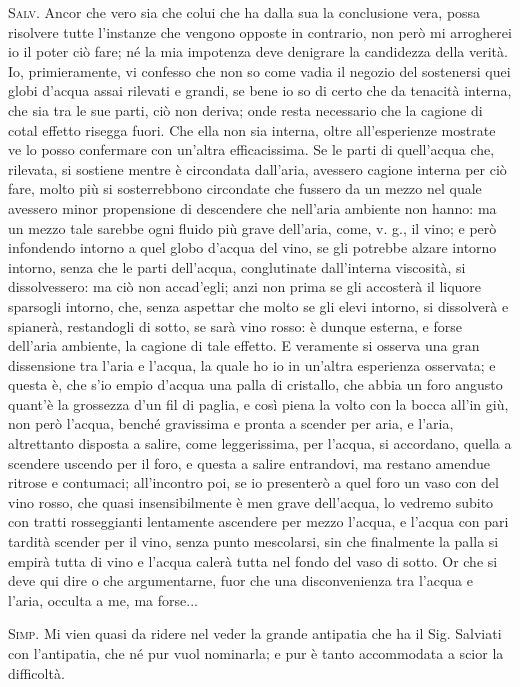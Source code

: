 \documentclass[11pt,twoside,openany]{book}
\newcommand{\speaker}[1]{\textcolor{rubric}{\textsc{#1}}\space}
\begin{document}
\speaker{Salv.} Ancor che vero sia che colui che ha dalla sua la conclusione vera, possa risolvere tutte l'instanze che vengono opposte in contrario, non però mi arrogherei io il poter ciò fare; né la mia impotenza deve denigrare la candidezza della verità. Io, primieramente, vi confesso che non so come vadia il negozio del sostenersi quei globi d'acqua assai rilevati e grandi, se bene io so di certo che da tenacità interna, che sia tra le sue parti, ciò non deriva; onde resta necessario che la cagione di cotal effetto risegga fuori. Che ella non sia interna, oltre all'esperienze mostrate ve lo posso confermare con un'altra efficacissima. Se le parti di quell'acqua che, rilevata, si sostiene mentre è circondata dall'aria, avessero cagione interna per ciò fare, molto più si sosterrebbono circondate che fussero da un mezzo nel quale avessero minor propensione di descendere che nell'aria ambiente non hanno: ma un mezzo tale sarebbe ogni fluido più grave dell'aria, come, v. g., il vino; e però infondendo intorno a quel globo d'acqua del vino, se gli potrebbe alzare intorno intorno, senza che le parti dell'acqua, conglutinate dall'interna viscosità, si dissolvessero: ma ciò non accad'egli; anzi non prima se gli accosterà il liquore sparsogli intorno, che, senza aspettar che molto se gli elevi intorno, si dissolverà e spianerà, restandogli di sotto, se sarà vino rosso: è dunque esterna, e forse dell'aria ambiente, la cagione di tale effetto. E veramente si osserva una gran dissensione tra l'aria e l'acqua, la quale ho io in un'altra esperienza osservata; e questa è, che s'io empio d'acqua una palla di cristallo, che abbia un foro angusto quant'è la grossezza d'un fil di paglia, e così piena la volto con la bocca all'in giù, non però l'acqua, benché gravissima e pronta a scender per aria, e l'aria, altrettanto disposta a salire, come leggerissima, per l'acqua, si accordano, quella a scendere uscendo per il foro, e questa a salire entrandovi, ma restano amendue ritrose e contumaci; all'incontro poi, se io presenterò a quel foro un vaso con del vino rosso, che quasi insensibilmente è men grave dell'acqua, lo vedremo subito con tratti rosseggianti lentamente ascendere per mezzo l'acqua, e l'acqua con pari tardità scender per il vino, senza punto mescolarsi, sin che finalmente la palla si empirà tutta di vino e l'acqua calerà tutta nel fondo del vaso di sotto. Or che si deve qui dire o che argumentarne, fuor che una disconvenienza tra l'acqua e l'aria, occulta a me, ma forse...

\speaker{Simp.} Mi vien quasi da ridere nel veder la grande antipatia che ha il Sig. Salviati con l'antipatia, che né pur vuol nominarla; e pur è tanto accommodata a scior la difficoltà.
\end{document}
